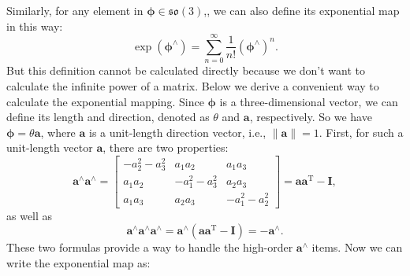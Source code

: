 Similarly, for any element in $\boldsymbol{\phi} \in \mathfrak{so}(3)$,, we can also define its exponential map in this way:
\begin{equation}
\exp(\boldsymbol{\phi}^\wedge) = \sum\limits_{n = 0}^\infty {\frac{1}{{n!}}{ (\boldsymbol{\phi}^{\wedge })^n}}.
\end{equation}
But this definition cannot be calculated directly because we don't want to calculate the infinite power of a matrix. Below we derive a convenient way to calculate the exponential mapping. Since $\boldsymbol{\phi}$ is a three-dimensional vector, we can define its length and direction,  denoted as $\theta$ and $\mathbf{a}$, respectively. So we have $\boldsymbol{\phi} = \theta \mathbf{a}$, where $\mathbf{a}$ is a unit-length direction vector, i.e., $\| \mathbf{a} \| =1$. First, for such a unit-length vector $\mathbf{a}$, there are two properties: 
\begin{equation}
 \mathbf{a}^{\wedge} \mathbf{a}^{\wedge} = \left[ {\begin{array}{*{20}{c}}
{ - a_2^2 - a_3^2}&{{a_1}{a_2}}&{{a_1}{a_3}}\\
{{a_1}{a_2}}&{ - a_1^2 - a_3^2}&{{a_2}{a_3}}\\
{{a_1}{a_3}}&{{a_2}{a_3}}&{ - a_1^2 - a_2^2}
\end{array}} \right] = \mathbf{a} \mathbf{a}^\mathrm{T} - \mathbf{I},
\end{equation}
as well as
\begin{equation}
\mathbf{a}^{\wedge} \mathbf{a}^{\wedge} \mathbf{a}^{\wedge} = \mathbf{a}^\wedge (\mathbf{a}\mathbf{a} ^\mathrm{T}-\mathbf{I}) = - \mathbf{a}^{\wedge}.
\end{equation}
These two formulas provide a way to handle the high-order $\mathbf{a}^\wedge$ items. Now we can write the exponential map as:
